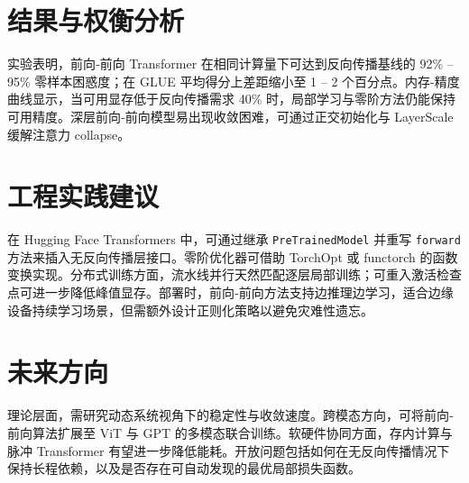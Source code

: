 \chapter{结果与权衡分析}
实验表明，前向‐前向 Transformer 在相同计算量下可达到反向传播基线的 92\%{} – 95\%{} 零样本困惑度；在 GLUE 平均得分上差距缩小至 1 – 2 个百分点。内存-精度曲线显示，当可用显存低于反向传播需求 40\%{} 时，局部学习与零阶方法仍能保持可用精度。深层前向‐前向模型易出现收敛困难，可通过正交初始化与 LayerScale 缓解注意力 collapse。\par
\chapter{工程实践建议}
在 Hugging Face Transformers 中，可通过继承 \texttt{PreTrainedModel} 并重写 \texttt{forward} 方法来插入无反向传播层接口。零阶优化器可借助 TorchOpt 或 functorch 的函数变换实现。分布式训练方面，流水线并行天然匹配逐层局部训练；可重入激活检查点可进一步降低峰值显存。部署时，前向‐前向方法支持边推理边学习，适合边缘设备持续学习场景，但需额外设计正则化策略以避免灾难性遗忘。\par
\chapter{未来方向}
理论层面，需研究动态系统视角下的稳定性与收敛速度。跨模态方向，可将前向‐前向算法扩展至 ViT 与 GPT 的多模态联合训练。软硬件协同方面，存内计算与脉冲 Transformer 有望进一步降低能耗。开放问题包括如何在无反向传播情况下保持长程依赖，以及是否存在可自动发现的最优局部损失函数。\par
